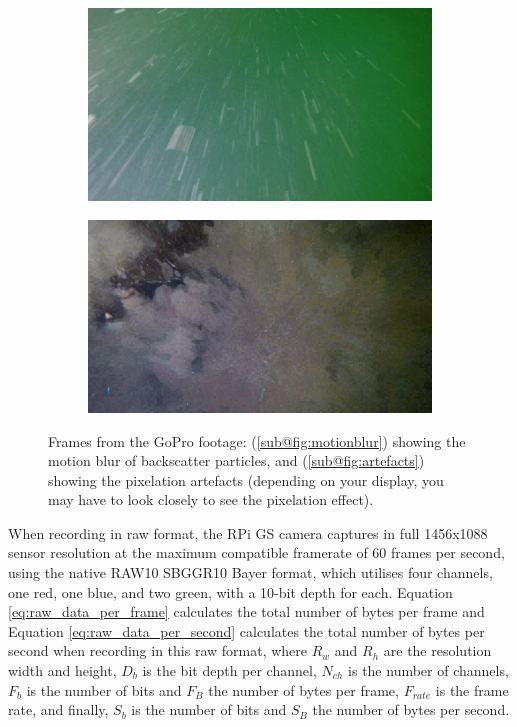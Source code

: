\begin{figure}[H]
    \centering
    \begin{subfigure}{.49\textwidth}
        \centering
        \includegraphics[width=1\linewidth]{assets/gopro_footage_streaks.jpg}
        \caption{}
        \label{fig:motionblur}
    \end{subfigure}
    \hfill
    \begin{subfigure}{.49\textwidth}
        \centering
        \includegraphics[width=1\linewidth]{assets/gopro_footage_artefacts.png}
        \caption{}
        \label{fig:artefacts}
    \end{subfigure}
    \caption{Frames from the GoPro footage: (\ref{sub@fig:motionblur}) showing the motion blur of backscatter particles, and (\ref{sub@fig:artefacts}) showing the pixelation artefacts (depending on your display, you may have to look closely to see the pixelation effect).}
    \label{fig:gopro}
\end{figure}

When recording in raw format, the RPi GS camera captures in full 1456x1088 sensor resolution at the maximum compatible framerate of 60 frames per second, using the native RAW10 SBGGR10 Bayer format, which utilises four channels, one red, one blue, and two green, with a 10-bit depth for each. Equation \ref{eq:raw_data_per_frame} calculates the total number of bytes per frame and Equation \ref{eq:raw_data_per_second} calculates the total number of bytes per second when recording in this raw format, where $R_w$ and $R_h$ are the resolution width and height, $D_b$ is the bit depth per channel, $N_{ch}$ is the number of channels, $F_b$ is the number of bits and $F_B$ the number of bytes per frame, $F_{rate}$ is the frame rate, and finally, $S_b$ is the number of bits and $S_B$ the number of bytes per second.

